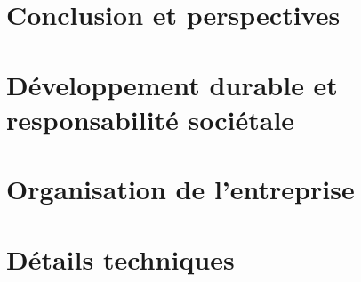 \documentclass[language=en, year=1A, enterprise=ensIIE]{ensiie-report}
\begin{document}

\newpage


\section{Conclusion et perspectives}\label{sec:conclusion}


\newpage


\appendix
\section{Développement durable et responsabilité sociétale}\label{sec:ddrs}


\newpage


\section{Organisation de l'entreprise}\label{sec:organisation}


\newpage


\section{Détails techniques}\label{sec:details_techniques}


\newpage


\renewcommand{\refname}{Références}
\label{sec:references}

\newpage

\end{document}
